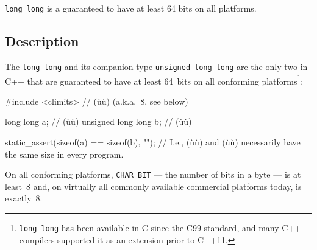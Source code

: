
\setcounter{table}{0}
\setcounter{footnote}{0}
\setcounter{lstlisting}{0}


\lstinline!long!~\lstinline!long! is a  guaranteed to have at least 64 bits on all
platforms.

\subsection[Description]{Description}\label{description}

The  \lstinline!long!~\lstinline!long! and its companion
type \lstinline!unsigned!~\lstinline!long!~\lstinline!long! are the only two
 in C++ that are guaranteed to have
at least 64~bits on all conforming platforms{\cprotect\footnote{\lstinline!long!~\lstinline!long!
has been available in C since the C99 standard, and many C++ compilers
  supported it as an extension prior to C++11.}}:

\begin{emcppslisting}
#include <climits>  // (ù{}ù) (a.k.a.~8, see below)

long long          a;  // (ù{}ù)
unsigned long long b;  // (ù{}ù)

static_assert(sizeof(a) == sizeof(b), "");
    // I.e., (ù{}ù) and (ù{}ù) necessarily have the same size in every program.
\end{emcppslisting}

\noindent On all conforming platforms, \lstinline!CHAR_BIT! --- the number of bits
in a byte --- is at least~8 and, on virtually all commonly available
commercial platforms today, is exactly~8.

